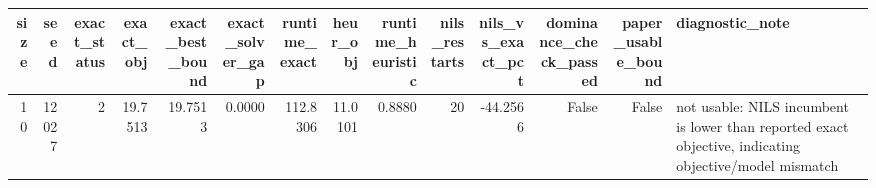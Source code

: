 \begin{tabular}{rrrrrrrrrrrrrl}
\toprule
size & seed & exact_status & exact_obj & exact_best_bound & exact_solver_gap & runtime_exact & heur_obj & runtime_heuristic & nils_restarts & nils_vs_exact_pct & dominance_check_passed & paper_usable_bound & diagnostic_note \\
\midrule
10 & 12027 & 2 & 19.7513 & 19.7513 & 0.0000 & 112.8306 & 11.0101 & 0.8880 & 20 & -44.2566 & False & False & not usable: NILS incumbent is lower than reported exact objective, indicating objective/model mismatch \\
\bottomrule
\end{tabular}
